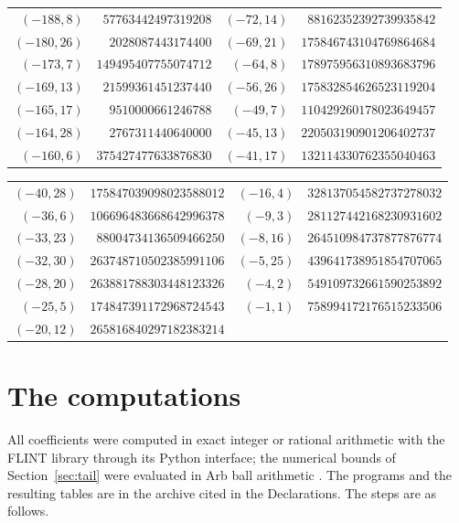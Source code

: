 \documentclass[11pt]{amsart}
\theoremstyle{definition}
\begin{document}
{\begin{tabular}{@{}r@{\ \ }r@{\qquad}r@{\ \ }r@{}}
$(-188,8)$ & $57763442497319208$ & $(-72,14)$ & $88162352392739935842$ \\
$(-180,26)$ & $2028087443174400$ & $(-69,21)$ & $175846743104769864684$ \\
$(-173,7)$ & $149495407755074712$ & $(-64,8)$ & $178975956310893683796$ \\
$(-169,13)$ & $21599361451237440$ & $(-56,26)$ & $175832854626523119204$ \\
$(-165,17)$ & $9510000661246788$ & $(-49,7)$ & $110429260178023649457$ \\
$(-164,28)$ & $2767311440640000$ & $(-45,13)$ & $220503190901206402737$ \\
$(-160,6)$ & $375427477633876830$ & $(-41,17)$ & $132114330762355040463$ \\
\end{tabular}}\par
{\scriptsize\begin{tabular}{@{}r@{\ \ }r@{\qquad}r@{\ \ }r@{}}
$(-40,28)$ & $175847039098023588012$ & $(-16,4)$ & $328137054582737278032$ \\
$(-36,6)$ & $106696483668642996378$ & $(-9,3)$ & $281127442168230931602$ \\
$(-33,23)$ & $88004734136509466250$ & $(-8,16)$ & $264510984737877876774$ \\
$(-32,30)$ & $263748710502385991106$ & $(-5,25)$ & $439641738951854707065$ \\
$(-28,20)$ & $263881788303448123326$ & $(-4,2)$ & $549109732661590253892$ \\
$(-25,5)$ & $174847391172968724543$ & $(-1,1)$ & $758994172176515233506$ \\
$(-20,12)$ & $265816840297182383214$ & & \\
\end{tabular}}\par\medskip

\section{The computations}\label{app:computation}

All coefficients were computed in exact integer or rational arithmetic with the FLINT library through its Python interface; the numerical bounds of Section~\ref{sec:tail} were evaluated in Arb ball arithmetic \cite{Joh17}. The programs and the resulting tables are in the archive cited in the Declarations. The steps are as follows.
\end{document}
